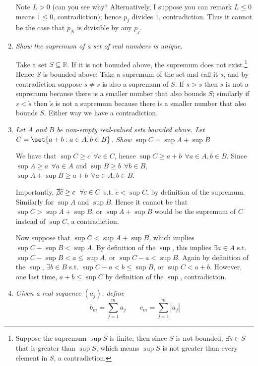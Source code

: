 \documentclass{article}
\begin{document}
\begin{enumerate}[1.]
      Note $L > 0$ (can you see why? Alternatively, I suppose you can remark $L \le 0$ means $1 \le 0$, contradiction); hence $p_j$ divides $1$, contradiction. Thus it cannot be the case that $\widetilde{p}_N$ is divisible by any $p_j$.

  \item \textit{Show the supremum of a set of real numbers is unique.}

    \solution Take a set $S \subseteq \mathbb{R}$. If it is not bounded above, the supremum does not exist.\footnote{Suppose the supremum $\sup S$ is finite; then since $S$ is not bounded, $\exists \widetilde{s} \in S$ that is greater than $\sup S$, which means $\sup S$ is not greater than every element in $S$, a contradiction.} Hence $S$ is bounded above: Take a supremum of the set and call it $s$, and by contradiction suppose $\widetilde{s} \ne s$ is also a supremum of $S$.  If $s > \widetilde{s}$ then $s$ is not a supremum because there is a smaller number that also bounds $S$; similarly if $s < \widetilde{s}$ then $\widetilde{s}$ is not a supremum because there is a smaller number that also bounds $S$. Either way we have a contradiction.

  \item \textit{Let $A$ and $B$ be non-empty real-valued sets bounded above. Let $C = \set{a +b: a \in A, b \in B}$. Show $\sup C = \sup A + \sup B$}

    \solution We have that $\sup C \ge c ~~ \forall c \in C$, hence $\sup C \ge a + b ~~ \forall a \in A, b \in B$.  Since $\sup A \ge a ~~ \forall a \in A$ and $\sup B \ge b ~~ \forall b \in B$, $\sup A + \sup B \ge a + b ~~ \forall a \in A, b \in B$.

      Importantly, $\cancel{\exists} \widetilde{c} \ge c ~~ \forall c \in C$ s.t. $\widetilde{c} < \sup C$, by definition of the supremum. Similarly for $\sup A$ and $\sup B$. Hence it cannot be that $\sup C > \sup A + \sup B$, or $\sup A + \sup B$ would be the supremum of $C$ instead of $\sup C$, a contradiction.

      Now suppose that $\sup C < \sup A + \sup B$, which implies $\sup C - \sup B < \sup A$. By definition of the $\sup$, this implies $\exists a \in A$ s.t. $\sup C - \sup B < a \le \sup A$, or $\sup C - a < \sup B$. Again by definition of the $\sup$, $\exists b \in B$ s.t. $\sup C - a < b \le \sup B$, or $\sup C < a + b$. However, one last time, $a + b \le \sup C$ by definition of the $\sup$, contradiction.

  \item \textit{Given a real sequence $(a_j)$, define}
    \[
        b_m = \sum^{m}_{j = 1} a_j
        \quad\quad
        c_m = \sum^{m}_{j = 1} |a_j|
    \]


\end{enumerate}
\end{document}

